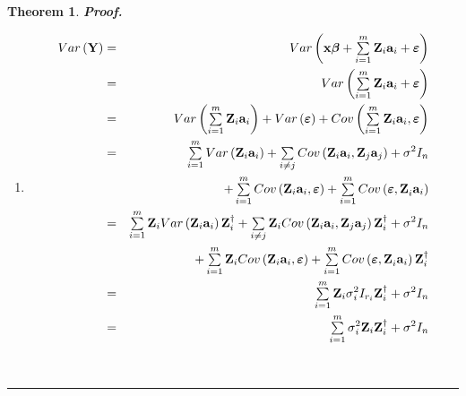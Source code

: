 \documentclass{article}
\newtheorem{theorem}{Theorem}
\newenvironment{proof}[1][Proof]{\noindent\textbf{#1.} }{\ \rule{0.5em}{0.5em}}
\begin{document}
\begin{theorem}
\begin{proof}
\begin{enumerate}
\item 
\begin{eqnarray*}
Var\left( \mathbf{Y}\right) &=&Var\left( \mathbf{x\beta }+\tsum%
\limits_{i=1}^{m}\mathbf{Z}_{i}\mathbf{a}_{i}+\mathbf{\varepsilon }\right) \\
&=&Var\left( \tsum\limits_{i=1}^{m}\mathbf{Z}_{i}\mathbf{a}_{i}+\mathbf{%
\varepsilon }\right) \\
&=&Var\left( \tsum\limits_{i=1}^{m}\mathbf{Z}_{i}\mathbf{a}_{i}\right)
+Var\left( \mathbf{\varepsilon }\right) +Cov\left( \tsum\limits_{i=1}^{m}%
\mathbf{Z}_{i}\mathbf{a}_{i},\mathbf{\varepsilon }\right) \\
&=&\tsum\limits_{i=1}^{m}Var\left( \mathbf{Z}_{i}\mathbf{a}_{i}\right)
+\tsum\limits_{i\neq j}Cov\left( \mathbf{Z}_{i}\mathbf{a}_{i},\mathbf{Z}_{j}%
\mathbf{a}_{j}\right) +\sigma ^{2}I_{n} \\
&&+\tsum\limits_{i=1}^{m}Cov\left( \mathbf{Z}_{i}\mathbf{a}_{i},\mathbf{%
\varepsilon }\right) +\tsum\limits_{i=1}^{m}Cov\left( \mathbf{\varepsilon ,Z}%
_{i}\mathbf{a}_{i}\right) \\
&=&\tsum\limits_{i=1}^{m}\mathbf{Z}_{i}Var\left( \mathbf{Z}_{i}\mathbf{a}%
_{i}\right) \mathbf{Z}_{i}^{\dagger }+\tsum\limits_{i\neq j}\mathbf{Z}%
_{i}Cov\left( \mathbf{Z}_{i}\mathbf{a}_{i},\mathbf{Z}_{j}\mathbf{a}%
_{j}\right) \mathbf{Z}_{i}^{\dagger }+\sigma ^{2}I_{n} \\
&&+\tsum\limits_{i=1}^{m}\mathbf{Z}_{i}Cov\left( \mathbf{Z}_{i}\mathbf{a}%
_{i},\mathbf{\varepsilon }\right) +\tsum\limits_{i=1}^{m}Cov\left( \mathbf{%
\varepsilon ,Z}_{i}\mathbf{a}_{i}\right) \mathbf{Z}_{i}^{\dagger } \\
&=&\tsum\limits_{i=1}^{m}\mathbf{Z}_{i}\sigma _{i}^{2}I_{r_{i}}\mathbf{Z}%
_{i}^{\dagger }+\sigma ^{2}I_{n} \\
&=&\tsum\limits_{i=1}^{m}\sigma _{i}^{2}\mathbf{Z}_{i}\mathbf{Z}%
_{i}^{\dagger }+\sigma ^{2}I_{n}
\end{eqnarray*}
\end{enumerate}
\end{proof}
\end{theorem}
\end{document}
